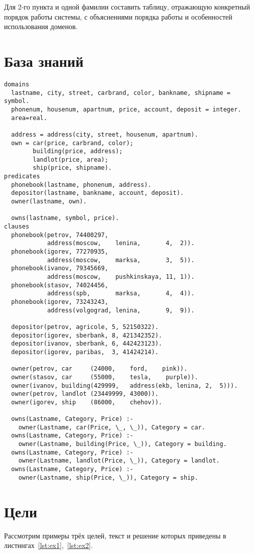 Для 2-го пункта и одной фамилии составить таблицу, отражающую конкретный порядок работы системы, с объяснениями порядка работы и особенностей использования доменов.

\section{База знаний}

\begin{lstlisting}[caption={База знаний},label={lst:knowledge}]
domains
  lastname, city, street, carbrand, color, bankname, shipname = symbol.
  phonenum, housenum, apartnum, price, account, deposit = integer.
  area=real.

  address = address(city, street, housenum, apartnum).
  own = car(price, carbrand, color);
        building(price, address);
        landlot(price, area);
        ship(price, shipname).
predicates
  phonebook(lastname, phonenum, address).
  depositor(lastname, bankname, account, deposit).
  owner(lastname, own).

  owns(lastname, symbol, price).
clauses
  phonebook(petrov, 74400297,
            address(moscow,    lenina,       4,  2)).
  phonebook(igorev, 77270935,
            address(moscow,    marksa,       3,  5)).
  phonebook(ivanov, 79345669,
            address(moscow,    pushkinskaya, 11, 1)).
  phonebook(stasov, 74024456,
            address(spb,       marksa,       4,  4)).
  phonebook(igorev, 73243243,
            address(volgograd, lenina,       9,  9)).

  depositor(petrov, agricole, 5, 52150322).
  depositor(igorev, sberbank, 8, 421342352).
  depositor(ivanov, sberbank, 6, 442423123).
  depositor(igorev, paribas,  3, 41424214).

  owner(petrov, car     (24000,    ford,    pink)).
  owner(stasov, car     (55000,    tesla,    purple)).
  owner(ivanov, building(429999,   address(ekb, lenina, 2,  5))).
  owner(petrov, landlot (23449999, 43000)).
  owner(igorev, ship    (86000,    chehov)).

  owns(Lastname, Category, Price) :-
    owner(Lastname, car(Price, \_, \_)), Category = car.
  owns(Lastname, Category, Price) :-
    owner(Lastname, building(Price, \_)), Category = building.
  owns(Lastname, Category, Price) :-
    owner(Lastname, landlot(Price, \_)), Category = landlot.
  owns(Lastname, Category, Price) :-
    owner(Lastname, ship(Price, \_)), Category = ship.
\end{lstlisting}

\section{Цели}
Рассмотрим примеры трёх целей, текст и решение которых приведены в листингах~\ref{lst:ex1},~\ref{lst:ex2}.

